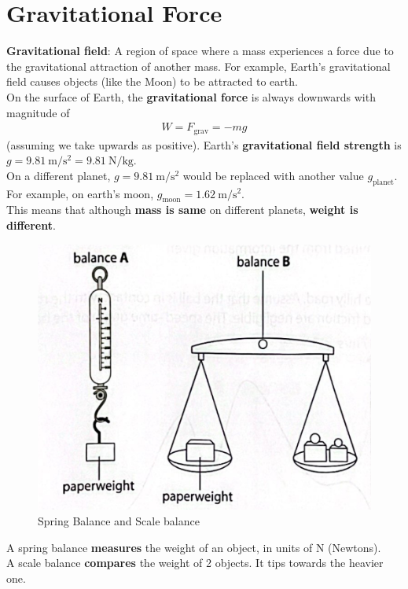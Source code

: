 \documentclass{article}
\begin{document}
\section{Gravitational Force}
\textbf{Gravitational field}: A region of space where a mass experiences a force due to the gravitational attraction of another mass. For example, Earth's gravitational field causes objects (like the Moon) to be attracted to earth. \\[10pt]
On the surface of Earth, the \textbf{gravitational force} is always downwards with magnitude of 
\begin{align}
    W = F_{\text{grav}} = -mg
\end{align}
(assuming we take upwards as positive). Earth's \textbf{gravitational field strength} is $g=9.81 \mathrm{~m} / \mathrm{s}^2 = 9.81 \mathrm{~N} / \mathrm{kg}$. \\[10pt]
\noindent On a different planet, $g=9.81 \mathrm{~m} / \mathrm{s}^2$ would be replaced with another value $g_{\text{planet}}$. For example, on earth's moon, $g_{\text{moon}} = 1.62 \mathrm{~m} / \mathrm{s}^2$. \\[10pt]
\noindent This means that although \textbf{mass is same} on different planets, \textbf{weight is different}.
\begin{figure}[h]
    \centering
    \includegraphics[width=\linewidth]{images/springbalance.png}
    \caption{Spring Balance and Scale balance}
    \label{fig:enter-label}
\end{figure}

\noindent A spring balance \textbf{measures} the weight of an object, in units of N (Newtons).\\[5pt]
A scale balance \textbf{compares} the weight of 2 objects. It tips towards the heavier one.
\end{document}
